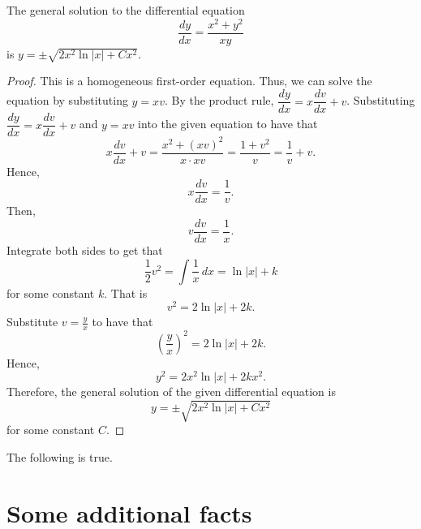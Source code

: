 \documentclass[ma491]{swumath}
\begin{document}
\begin{theorem}
The general solution to the differential equation 
\begin{equation}
\frac{dy}{dx} = \frac{x^2 + y^2}{xy}
\end{equation}
is $y = \pm \sqrt{2 x^2 \ln |x| + C x^2}$.
\end{theorem}
\begin{proof}
This is a homogeneous first-order equation. Thus, we can solve the equation by substituting $y = xv$. By the product rule, $\dfrac{dy}{dx} = x \dfrac{dv}{dx} + v$. Substituting $\dfrac{dy}{dx} = x \dfrac{dv}{dx} + v$ and $y = xv$ into the given equation to have that
\begin{equation}
x \dfrac{dv}{dx} + v = \frac{x^2 + (xv)^2}{x \cdot xv} = \frac{1 + v^2}{v} = \frac{1}{v} + v.
\end{equation}
Hence,
\begin{equation} x \dfrac{dv}{dx} = \frac{1}{v}. \end{equation}
Then,
\begin{equation} v \dfrac{dv}{dx} = \frac{1}{x}. \end{equation}
Integrate both sides to get that
\begin{equation} \frac{1}{2}v^2 = \int \frac{1}{x} \, dx = \ln |x| + k \end{equation}
for some constant $k$. That is 
\begin{equation} v^2 = 2 \ln |x| + 2k. \end{equation} 
Substitute $v = \frac{y}{x}$ to have that
\begin{equation} \left( \frac{y}{x} \right)^2 = 2 \ln |x| + 2k. \end{equation} 
Hence,
\begin{equation} y^2 = 2 x^2 \ln |x| + 2k x^2. \end{equation} 
Therefore, the general solution of the given differential equation is  
\[y = \pm \sqrt{2 x^2 \ln |x| + C x^2}\]
for some constant $C$.
\end{proof}

\begin{corollary}
The following is true.
\end{corollary}

\appendix

\chapter{Some additional facts}
\end{document}
